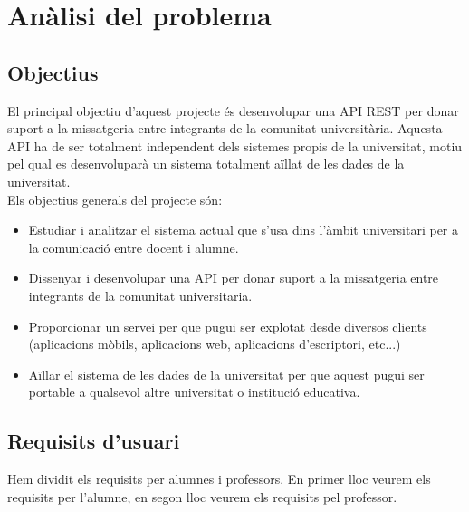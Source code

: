 
\chapter{Anàlisi del problema}\label{analisi}

\section{Objectius} \label{objectius}
El principal objectiu d'aquest projecte és desenvolupar una \ac{API} \ac{REST} per donar suport a la missatgeria entre integrants de la comunitat universitària. Aquesta \ac{API} ha de ser totalment independent dels sistemes propis de la universitat, motiu pel qual es desenvoluparà un sistema totalment aïllat de les dades de la universitat. \\

Els objectius generals del projecte són:
\begin{itemize}
	\item Estudiar i analitzar el sistema actual que s'usa dins l'àmbit universitari per a la comunicació entre docent i alumne.
	\item Dissenyar i desenvolupar una \ac{API} per donar suport a la missatgeria entre integrants de la comunitat universitaria.
	\item Proporcionar un servei per que pugui ser explotat desde diversos clients (aplicacions mòbils, aplicacions web, aplicacions d'escriptori, etc...)
	\item Aïllar el sistema de les dades de la universitat per que aquest pugui ser portable a qualsevol altre universitat o institució educativa.
\end{itemize}
\section{Requisits d'usuari}
Hem dividit els requisits per alumnes i professors. En primer lloc veurem els requisits per l'alumne, en segon lloc veurem els requisits pel professor.
